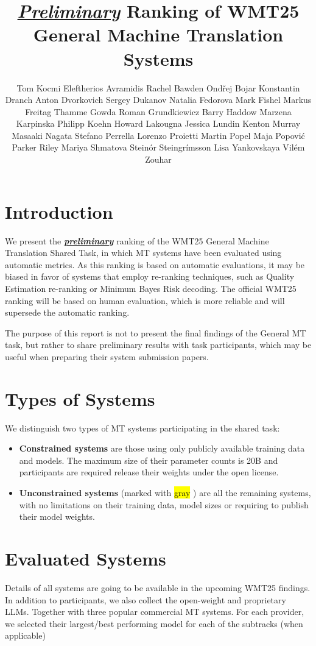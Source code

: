 \documentclass[11pt]{article}
\title{\underline{\textit{Preliminary}} Ranking of WMT25 General Machine Translation Systems}
\author{
  \null \AND
  Tom Kocmi  
  \And
  Eleftherios Avramidis 
  \And
  Rachel Bawden 
  \And
  Ond\v{r}ej Bojar
  \And
  Konstantin Dranch
  \AND
  Anton Dvorkovich 
  \And
  Sergey Dukanov 
  \And
  Natalia Fedorova 
  \And
  Mark Fishel  
  \And
  Markus Freitag
  \AND
  Thamme Gowda
  \And
  Roman Grundkiewicz
  \And
  Barry Haddow  
  \And
  Marzena Karpinska 
  \AND
  Philipp Koehn 
  \And
  Howard Lakougna
  \And
  Jessica Lundin
  \And
  Kenton Murray 
  \And
  Masaaki Nagata
  \AND
  Stefano Perrella 
  \And
  Lorenzo Proietti
  \And
  Martin Popel 
  \And 
  Maja Popovi\'{c}  
  \And
  Parker Riley 
  \AND
  Mariya Shmatova 
  \And
  Stein\th\'{o}r Steingr\'{i}msson 
  \And
  Lisa Yankovskaya 
  \And 
  Vilém Zouhar
% 
  \vspace{2cm}
}
\newcommand{\hlc}[2][yellow]{{%
    \colorlet{foo}{#1}%
    \sethlcolor{foo}\hl{#2}}%
}
\begin{document}
\maketitle


\section*{Introduction}

We present the \underline{\textbf{\textit{preliminary}}} ranking of the WMT25 General Machine Translation Shared Task, in which MT systems have been evaluated using automatic metrics. As this ranking is based on automatic evaluations, it may be biased in favor of systems that employ re-ranking techniques, such as Quality Estimation re-ranking or Minimum Bayes Risk decoding. The official WMT25 ranking will be based on human evaluation, which is more reliable and will supersede the automatic ranking.

The purpose of this report is not to present the final findings of the General MT task, but rather to share preliminary results with task participants, which may be useful when preparing their system submission papers.

\section*{Types of Systems}

We distinguish two types of MT systems participating in the shared task:
\begin{itemize}%
\item \textbf{Constrained systems} are those using only publicly available training data and models. The maximum size of their parameter counts is 20B and participants are required release their weights under the open license. 

\item \textbf{Unconstrained systems} (marked with \hlc[gray!30]{gray}) are all the remaining systems, with no limitations on their training data, model sizes or requiring to publish their model weights.
\end{itemize}


\section*{Evaluated Systems}

Details of all systems are going to be available in the upcoming WMT25 findings.
In addition to participants, we also collect the open-weight and proprietary LLMs. Together with three popular commercial MT systems. For each provider, we selected their largest/best performing model for each of the subtracks (when applicable)
\end{document}
